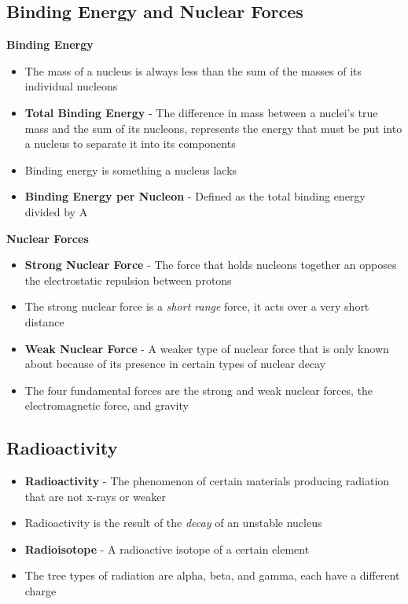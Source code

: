 \subsection{Binding Energy and Nuclear Forces}
\textbf{Binding Energy}
\begin{itemize}
    \item The mass of a nucleus is always less than the sum of the masses of its individual nucleons
    \item \textbf{Total Binding Energy} - The difference in mass between a nuclei's true mass and the sum of its nucleons, represents the energy that must be put into a nucleus to separate it into its components
    \item Binding energy is something a nucleus lacks
    \item \textbf{Binding Energy per Nucleon} - Defined as the total binding energy divided by A
\end{itemize}

\textbf{Nuclear Forces}
\begin{itemize}
    \item \textbf{Strong Nuclear Force} - The force that holds nucleons together an opposes the electrostatic repulsion between protons
    \item The strong nuclear force is a \emph{short range} force, it acts over a very short distance
    \item \textbf{Weak Nuclear Force} - A weaker type of nuclear force that is only known about because of its presence in certain types of nuclear decay
    \item The four fundamental forces are the strong and weak nuclear forces, the electromagnetic force, and gravity
\end{itemize}

\subsection{Radioactivity}
\begin{itemize}
    \item \textbf{Radioactivity} - The phenomenon of certain materials producing radiation that are not x-rays or weaker
    \item Radioactivity is the result of the \emph{decay} of an unstable nucleus
    \item \textbf{Radioisotope} - A radioactive isotope of a certain element
    \item The tree types of radiation are alpha, beta, and gamma, each have a different charge
\end{itemize}


